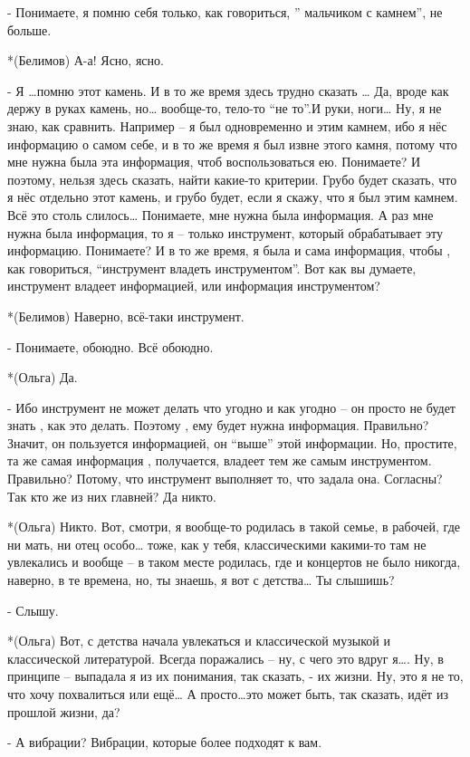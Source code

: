 - Понимаете, я помню себя только, как говориться, ” мальчиком с камнем”, не больше.

*(Белимов) А-а! Ясно, ясно.

- Я …помню этот камень. И в то же время здесь трудно сказать … Да, вроде как держу в руках камень, но… вообще-то, тело-то  “не то”.И руки, ноги…  Ну, я не знаю, как сравнить. Например – я был одновременно и этим камнем, ибо я нёс информацию о самом себе, и в то же время я был извне этого камня, потому что мне нужна была эта информация, чтоб воспользоваться ею. Понимаете? И поэтому, нельзя здесь сказать, найти какие-то критерии. Грубо будет сказать, что я нёс отдельно этот камень, и грубо будет, если я скажу, что я был этим камнем. Всё это столь слилось… Понимаете, мне нужна была информация. А раз мне нужна была информация, то я – только инструмент, который обрабатывает эту информацию. Понимаете? И в то же время, я была и сама информация, чтобы , как говориться, “инструмент владеть инструментом”. Вот как вы думаете, инструмент владеет информацией, или информация инструментом?

*(Белимов) Наверно, всё-таки инструмент.

- Понимаете, обоюдно. Всё обоюдно.

*(Ольга) Да.

- Ибо инструмент не может делать что угодно и как угодно – он просто не будет знать , как это делать. Поэтому , ему будет нужна информация. Правильно? Значит, он пользуется информацией, он “выше” этой информации. Но, простите, та же самая информация , получается, владеет тем же самым инструментом. Правильно? Потому, что инструмент выполняет то, что задала она. Согласны? Так кто же из них главней? Да никто.

*(Ольга) Никто. Вот, смотри, я вообще-то родилась в такой семье, в рабочей, где ни мать, ни отец  особо…  тоже, как у тебя, классическими какими-то там не увлекались и вообще – в таком месте родилась, где и концертов не было никогда, наверно, в те времена, но, ты знаешь, я вот с детства… Ты слышишь?

- Слышу.

*(Ольга) Вот, с детства начала увлекаться и классической музыкой и классической литературой. Всегда поражались – ну, с  чего это вдруг я…. Ну, в принципе – выпадала я из их понимания, так сказать, - их жизни. Ну, это я не то, что хочу похвалиться или ещё… А просто…это может быть, так сказать, идёт из прошлой жизни, да?

- А вибрации? Вибрации, которые более подходят к вам.


